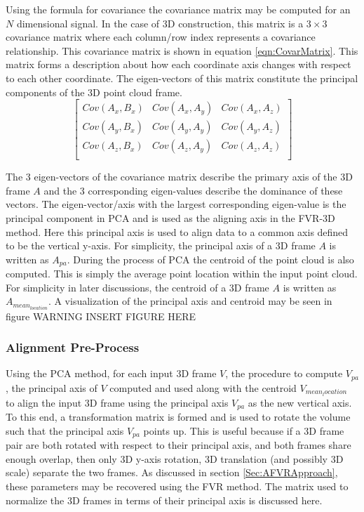 Using the formula for covariance the covariance matrix may be computed for an $N$ dimensional signal. In the case of 3D construction, this matrix is a $3 \times 3$ covariance matrix where each column/row index represents a covariance relationship. This covariance matrix is shown in equation \ref{eqn:CovarMatrix}. This matrix forms a description about how each coordinate axis changes with respect to each other coordinate. The eigen-vectors of this matrix constitute the principal components of the 3D point cloud frame. \\

\begin{equation} \label{eqn:CovarMatrix}
\left[
\begin{array}{ccc}
Cov(A_x, B_x) & Cov(A_x, A_y) & Cov(A_x, A_z) \\
Cov(A_y, B_x) & Cov(A_y, A_y) & Cov(A_y, A_z) \\
Cov(A_z, B_x) & Cov(A_z, A_y) & Cov(A_z, A_z) \\
\end{array}
\right]
\end{equation}

The 3 eigen-vectors of the covariance matrix describe the primary axis of the 3D frame $A$ and the 3 corresponding eigen-values describe the dominance of these vectors. The eigen-vector/axis with the largest corresponding eigen-value is the principal component in PCA and is used as the aligning axis in the FVR-3D method. Here this principal axis is used to align data to a common axis defined to be the vertical y-axis. For simplicity, the principal axis of a 3D frame $A$ is written as $A_{pa}$. During the process of PCA the centroid of the point cloud is also computed. This is simply the average point location within the input point cloud. For simplicity in later discussions, the centroid of a 3D frame $A$ is written as $A_{mean_{location}}$. A visualization of the principal axis and centroid may be seen in figure WARNING INSERT FIGURE HERE \\

\subsubsection{Alignment Pre-Process}

Using the PCA method, for each input 3D frame $V$, the procedure to compute $V_{pa}$, the principal axis of $V$ computed and used along with the centroid $V_{mean_location}$ to align the input 3D frame using the principal axis $V_{pa}$ as the new vertical axis. To this end, a transformation matrix is formed and is used to rotate the volume such that the principal axis $V_{pa}$ points up. This is useful because if a 3D frame pair are both rotated with respect to their principal axis, and both frames share enough overlap, then only 3D y-axis rotation, 3D translation (and possibly 3D scale) separate the two frames. As discussed in section \ref{Sec:AFVRApproach}, these parameters may be recovered using the FVR method. The matrix used to normalize the 3D frames in terms of their principal axis is discussed here. \\

